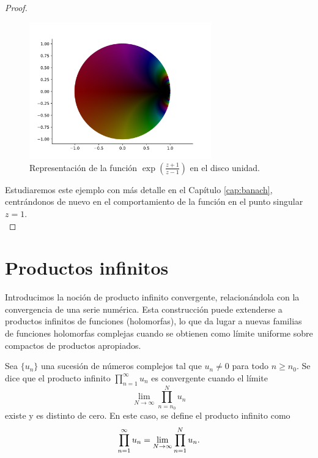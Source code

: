 \begin{proof}
\begin{figure}[h]
    \centering
    \includegraphics[width=0.7\textwidth]{../Aplicacion/e^((z+1):(z-1)).png}
    \caption{Representación de la función $\exp{\left(\frac{z + 1}{z - 1}\right)}$ en el disco unidad.}
    \label{fig:ejemplo5}
\end{figure}

     Estudiaremos este ejemplo con más detalle en el Capítulo \ref{cap:banach}, centrándonos de nuevo en el comportamiento de la función en el punto singular $z = 1$. \\

\end{proof}

\section{Productos infinitos}

Introducimos la noción de producto infinito convergente, relacionándola con la convergencia de una serie numérica. Esta construcción puede extenderse a productos infinitos de funciones (holomorfas), lo que da lugar a nuevas familias de funciones holomorfas complejas cuando se obtienen como límite uniforme sobre compactos de productos apropiados. \\

\begin{definition}
    Sea $\{u_n\}$ una sucesión de números complejos tal que $u_n \neq 0$ para todo $n \geq n_0$. Se dice que el producto infinito $\prod_{n=1}^{\infty} u_n$ es convergente cuando el límite
    \begin{equation*}
        \lim_{N \to \infty} \prod_{n=n_0}^{N} u_n
    \end{equation*}
    existe y es distinto de cero. En este caso, se define el producto infinito como
    \begin{equation*}
        \prod_{n=1}^{\infty} u_n = \lim_{N \to \infty} \prod_{n=1}^{N} u_n. \\
    \end{equation*}
\end{definition}

